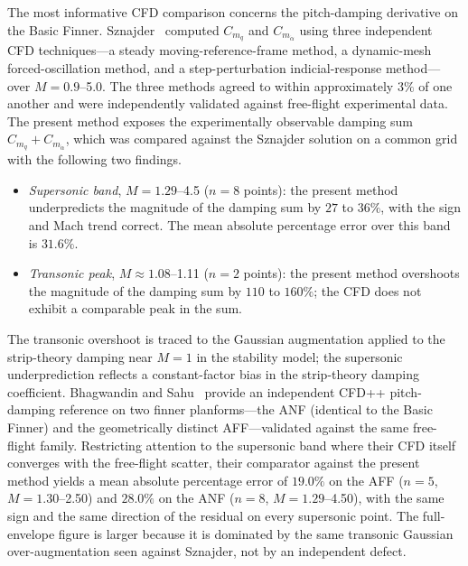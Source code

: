 The most informative CFD comparison concerns the pitch-damping derivative on the
Basic Finner. Sznajder~\cite{sznajder2025} computed $C_{m_q}$ and
$C_{m_{\dot\alpha}}$ using three independent CFD techniques---a steady
moving-reference-frame method, a dynamic-mesh forced-oscillation method, and a
step-perturbation indicial-response method---over $M = 0.9$--5.0. The three methods
agreed to within approximately $3\%$ of one another and were independently
validated against free-flight experimental data. The present method exposes the
experimentally observable damping sum $C_{m_q}+C_{m_{\dot\alpha}}$, which was
compared against the Sznajder solution on a common grid with the following two
findings.

\begin{itemize}
  \item \emph{Supersonic band}, $M = 1.29$--4.5 ($n = 8$ points): the present
        method underpredicts the magnitude of the damping sum by $27$ to $36\%$,
        with the sign and Mach trend correct. The mean absolute percentage error
        over this band is $31.6\%$.
  \item \emph{Transonic peak}, $M \approx 1.08$--1.11 ($n = 2$ points): the present
        method overshoots the magnitude of the damping sum by $110$ to $160\%$;
        the CFD does not exhibit a comparable peak in the sum.
\end{itemize}

The transonic overshoot is traced to the Gaussian augmentation applied to the
strip-theory damping near $M = 1$ in the stability model; the supersonic
underprediction reflects a constant-factor bias in the strip-theory damping
coefficient. Bhagwandin and Sahu~\cite{bhagwandin2013} provide an independent
CFD++ pitch-damping reference on two finner planforms---the ANF (identical to the
Basic Finner) and the geometrically distinct AFF---validated against the same
free-flight family. Restricting attention to the supersonic band where their CFD
itself converges with the free-flight scatter, their comparator against the
present method yields a mean absolute percentage error of $19.0\%$ on the AFF
($n=5$, $M = 1.30$--2.50) and $28.0\%$ on the ANF ($n=8$, $M = 1.29$--4.50), with
the same sign and the same direction of the residual on every supersonic point.
The full-envelope figure is larger because it is dominated by the same transonic
Gaussian over-augmentation seen against Sznajder, not by an independent defect.

